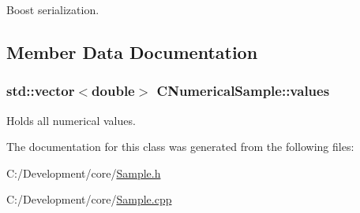 Boost serialization. 



\subsection{Member Data Documentation}
\hypertarget{class_c_numerical_sample_a2e2653a81d6c91eafc0548c0e7b50227}{
\subsubsection[{values}]{\setlength{\rightskip}{0pt plus 5cm}std\-::vector$<$double$>$ C\-Numerical\-Sample\-::values\hspace{0.3cm}{\ttfamily [private]}}}\label{class_c_numerical_sample_a2e2653a81d6c91eafc0548c0e7b50227}
Holds all numerical values. 

The documentation for this class was generated from the following files\-:\begin{DoxyCompactItemize}
\item 
C\-:/\-Development/core/\hyperlink{_sample_8h}{Sample.\-h}\item 
C\-:/\-Development/core/\hyperlink{_sample_8cpp}{Sample.\-cpp}\end{DoxyCompactItemize}
